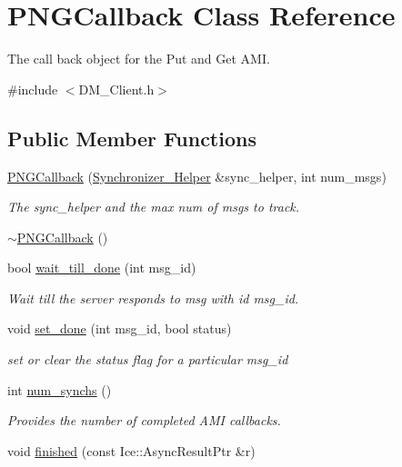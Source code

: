 \hypertarget{class_p_n_g_callback}{
\section{PNGCallback Class Reference}
\label{class_p_n_g_callback}
}


The call back object for the Put and Get AMI.  




{\ttfamily \#include $<$DM\_\-Client.h$>$}

\subsection*{Public Member Functions}
\begin{DoxyCompactItemize}
\item 
\hyperlink{class_p_n_g_callback_a5171eeb1412a198a7645858067ee0e32}{PNGCallback} (\hyperlink{class_synchronizer___helper}{Synchronizer\_\-Helper} \&sync\_\-helper, int num\_\-msgs)
\begin{DoxyCompactList}\small\item\em The sync\_\-helper and the max num of msgs to track. \item\end{DoxyCompactList}\item 
\hyperlink{class_p_n_g_callback_ac3e33d408123c2cfafef78a38652fdaa}{$\sim$PNGCallback} ()
\item 
bool \hyperlink{class_p_n_g_callback_ad596e1f14c89d03e3f18cb71833d02c5}{wait\_\-till\_\-done} (int msg\_\-id)
\begin{DoxyCompactList}\small\item\em Wait till the server responds to msg with id msg\_\-id. \item\end{DoxyCompactList}\item 
void \hyperlink{class_p_n_g_callback_acdc65eaca43bead9c0f08cfe5e9e5338}{set\_\-done} (int msg\_\-id, bool status)
\begin{DoxyCompactList}\small\item\em set or clear the status flag for a particular msg\_\-id \item\end{DoxyCompactList}\item 
int \hyperlink{class_p_n_g_callback_a29f77829fce8f6a82032ece93fc8226e}{num\_\-synchs} ()
\begin{DoxyCompactList}\small\item\em Provides the number of completed AMI callbacks. \item\end{DoxyCompactList}\item 
void \hyperlink{class_p_n_g_callback_a568d03d9ea319a1b2d7207b25a3847a5}{finished} (const Ice::AsyncResultPtr \&r)
\end{DoxyCompactItemize}


